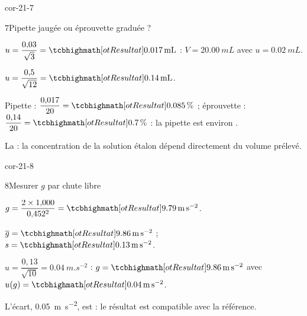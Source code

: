 \begin{blocLivre}{cor-21-7}
\begin{corrige}{7}{Pipette jaugée ou éprouvette graduée ?}
\begin{questions}
\item $u=\dfrac{0{,}03}{\sqrt{3}}=\res{\qty{0,017}{mL}}$ : $V=\qty{20,00}{mL}$ avec $u=\qty{0,02}{mL}$.
\item $u=\dfrac{0{,}5}{\sqrt{12}}=\res{\qty{0,14}{mL}}$.
\item Pipette : $\dfrac{0{,}017}{20}=\res{\qty{0,085}{\percent}}$ ; éprouvette : $\dfrac{0{,}14}{20}=\res{\qty{0,7}{\percent}}$ : la pipette est environ .
\item La  : la concentration de la solution étalon dépend directement du volume prélevé.
\end{questions}
\end{corrige}
\end{blocLivre}
\begin{blocLivre}{cor-21-8}
\begin{corrige}{8}{Mesurer $g$ par chute libre}
\begin{questions}
\item $g=\dfrac{2\times1{,}000}{0{,}452^2}=\res{\qty{9,79}{m.s^{-2}}}$.
\item $\overline{g}=\res{\qty{9,86}{m.s^{-2}}}$ ; $s=\res{\qty{0,13}{m.s^{-2}}}$.
\item $u=\dfrac{0{,}13}{\sqrt{10}}=\qty{0,04}{m.s^{-2}}$ : $g=\res{\qty{9,86}{m.s^{-2}}}$ avec $u(g)=\res{\qty{0,04}{m.s^{-2}}}$.
\item L'écart, \qty{0,05}{m.s^{-2}}, est  : le résultat est compatible avec la référence.
\end{questions}
\end{corrige}
\end{blocLivre}
